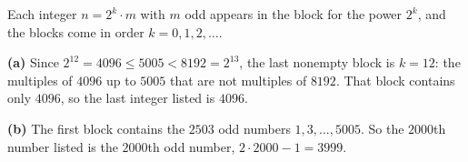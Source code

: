 Each integer $n=2^k\cdot m$ with $m$ odd appears in the block for the power $2^k$, and the blocks come in order $k=0,1,2,\dots$.

\textbf{(a)} Since $2^{12}=4096\le5005<8192=2^{13}$, the last nonempty block is $k=12$: the multiples of $4096$ up to $5005$ that are not multiples of $8192$. That block contains only $4096$, so the last integer listed is $\boxed{4096}$.

\textbf{(b)} The first block contains the $2503$ odd numbers $1,3,\dots,5005$. So the $2000$th number listed is the $2000$th odd number, $2\cdot2000-1=\boxed{3999}$.
